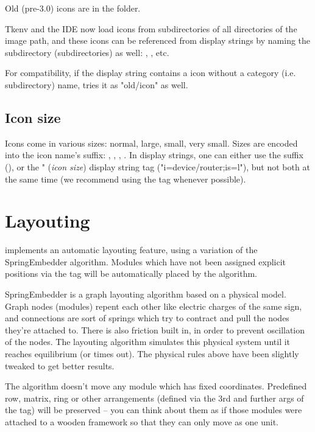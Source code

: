 Old (pre-3.0) icons are in the  folder.

Tkenv and the IDE now load icons from subdirectories of all directories
of the image path, and these icons can be referenced from display strings
by naming the subdirectory (subdirectories) as well:
, , etc.

For compatibility, if the display string contains a icon without
a category (i.e. subdirectory) name, {\opp} tries it as "old/icon" as well.

\subsection{Icon size}

Icons come in various sizes: normal, large, small, very small. Sizes are
encoded into the icon name's suffix: , , , .
In display strings, one can either use the suffix (),
or the " (\textit{icon size}) display string tag ("i=device/router;is=l"),
but not both at the same time (we recommend using the  tag whenever possible).


\section{Layouting}
\label{sec:ch-graphics:layouting}

{\opp} implements an automatic layouting feature, using
a variation of the SpringEmbedder algorithm. Modules which have
not been assigned explicit positions via the  tag will be
automatically placed by the algorithm.

SpringEmbedder is a graph layouting algorithm based on a physical model.
Graph nodes (modules) repent each other like electric charges
of the same sign, and connections are sort of springs which try
to contract and pull the nodes they're attached to. There is also friction
built in, in order to prevent oscillation of the nodes. The layouting algorithm
simulates this physical system until it reaches equilibrium
(or times out). The physical rules above have been slightly tweaked
to get better results.

The algorithm doesn't move any module which has fixed coordinates.
Predefined row, matrix, ring or other arrangements (defined
via the 3rd and further args of the  tag) will be preserved --
you can think about them as if those modules were attached
to a wooden framework so that they can only move as one unit.

